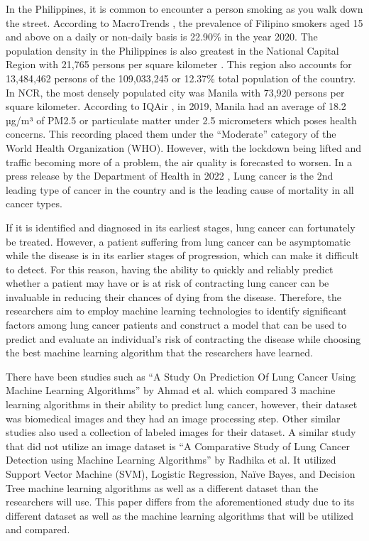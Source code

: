 \documentclass[runningheads]{llncs}
\begin{document}
In the Philippines, it is common to encounter a person smoking as you walk down the street. According to MacroTrends \cite{macrotrends2022}, the prevalence of Filipino smokers aged 15 and above on a daily or non-daily basis is 22.90\% in the year 2020. The population density in the Philippines is also greatest in the National Capital Region with 21,765 persons per square kilometer \cite{philippinestatisticsauthority2021}. This region also accounts for 13,484,462 persons of the 109,033,245 or 12.37\% total population of the country. In NCR, the most densely populated city was Manila with 73,920 persons per square kilometer. According to IQAir \cite{IQAir2022}, in 2019, Manila had an average of 18.2 µg/m³ of PM2.5 or particulate matter under 2.5 micrometers which poses health concerns. This recording placed them under the “Moderate” category of the World Health Organization (WHO). However, with the lockdown being lifted and traffic becoming more of a problem, the air quality is forecasted to worsen. In a press release by the  Department of Health in 2022 \cite{doh2021}, Lung cancer is the 2nd leading type of cancer in the country and is the leading cause of mortality in all cancer types. 

If it is identified and diagnosed in its earliest stages, lung cancer can fortunately be treated. However, a patient suffering from lung cancer can be asymptomatic while the disease is in its earlier stages of progression, which can make it difficult to detect. For this reason, having the ability to quickly and reliably predict whether a patient may have or is at risk of contracting lung cancer can be invaluable in reducing their chances of dying from the disease. 
Therefore, the researchers aim to employ machine learning technologies to identify significant factors among lung cancer patients and construct a model that can be used to predict and evaluate an individual's risk of contracting the disease while choosing the best machine learning algorithm that the researchers have learned. 

There have been studies such as “A Study On Prediction Of Lung Cancer Using Machine Learning Algorithms” by Ahmad et al. \cite{gupta2022} which compared 3 machine learning algorithms in their ability to predict lung cancer, however, their dataset was biomedical images and they had an image processing step. Other similar studies also used a collection of labeled images for their dataset. A similar study that did not utilize an image dataset is “A Comparative Study of Lung Cancer Detection using Machine Learning Algorithms” by Radhika et al. \cite{radhika2019} It utilized Support Vector Machine (SVM), Logistic Regression, Naïve Bayes, and Decision Tree machine learning algorithms as well as a different dataset than the researchers will use. This paper differs from the aforementioned study due to its different dataset as well as the machine learning algorithms that will be utilized and compared.
\end{document}
